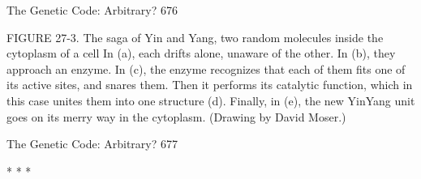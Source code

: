 The Genetic Code: Arbitrary?                                                           676

FIGURE 27-3. The saga of Yin and Yang, two random molecules inside the cytoplasm
of a cell In (a), each drifts alone, unaware of the other. In (b), they approach an
enzyme. In (c), the enzyme recognizes that each of them fits one of its active sites, and
snares them. Then it performs its catalytic function, which in this case unites them
into one structure (d). Finally, in (e), the new YinYang unit goes on its merry way in
the cytoplasm. (Drawing by David Moser.)



The Genetic Code: Arbitrary?                                                         677

                                       *   *   *

